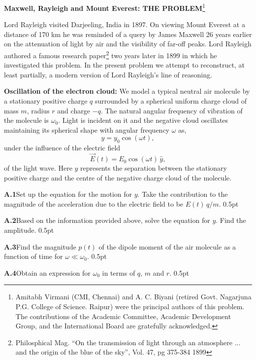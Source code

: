 {\large\textbf{Maxwell, Rayleigh and Mount Everest: THE PROBLEM}}\footnote{Amitabh Virmani (CMI, Chennai) and A. C. Biyani (retired Govt. Nagarjuna P.G. College of Science. Raipur) were the principal authors of this problem. The contributions of the Academic Committee, Academic Development Group, and the International Board are gratefully acknowledged.}

Lord Rayleigh visited Darjeeling, India in 1897. On viewing Mount Everest at a
distance of 170 km he was reminded of a query by James Maxwell 26 years
earlier on the attenuation of light by air and the visibility of far-off
peaks. Lord Rayleigh authored a famous research
paper\footnote{Philosphical Mag. ``On the transmission of light through an atmosphere ... and the origin of the blue of the sky'', Vol. 47, pg 375-384 1899}
two years later in 1899 in which he investigated this problem. In the present
problem we attempt to reconstruct, at least partially, a modern version of
Lord Rayleigh's line of reasoning.

\textbf{Oscillation of the electron cloud:} We model a typical neutral air
molecule by a stationary positive charge $q$ surrounded by a spherical uniform
charge cloud of mass $m$, radius $r$ and charge $-q$. The natural angular
frequency of vibration of the molecule is $\omega_0$. Light is incident on it
and the negative cloud oscillates maintaining its spherical shape with angular
frequency $\omega$ as,
\begin{equation}
y = y_0\cos(\omega t), \tag{1}
\end{equation}
under the influence of the electric field
\begin{equation}
\vec{E}(t) = E_0\cos(\omega t)\,\hat{y}, \tag{2}
\end{equation}
of the light wave. Here $y$ represents the separation between the stationary
positive charge and the centre of the negative charge cloud of the molecule.

\textbf{A.1}\quad Set up the equation for the motion for $y$. Take the
contribution to the magnitude of the acceleration due to the electric field to
be $E(t)\,q/m$. \hfill 0.5pt

\textbf{A.2}\quad Based on the information provided above, solve the equation
for $y$. Find the amplitude. \hfill 0.5pt

\textbf{A.3}\quad Find the magnitude $p(t)$ of the dipole moment of the air
molecule as a function of time for $\omega \ll \omega_0$. \hfill 0.5pt

\textbf{A.4}\quad Obtain an expression for $\omega_0$ in terms of $q$, $m$ and
$r$. \hfill 0.5pt

